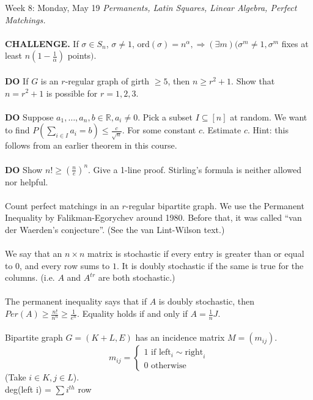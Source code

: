 \documentclass[12pt]{article}
\theoremstyle{remark}
\newcommand{\R}{\mathbb{R}}
\newcommand{\IF}{\text{ if }}
\newcommand{\ow}{\text{ otherwise }}
\newcommand{\ord}{\mathrm{ord}}
\begin{document}
\newpage

\label{22}\begin{section}{Week 8: Monday, May 19}
\indent\textit{Permanents, Latin Squares, Linear Algebra, Perfect Matchings.}
\\\\
\textbf{CHALLENGE.} If $\sigma \in S_n$, $\sigma \neq 1$, $\ord(\sigma) = n^\alpha, \Rightarrow (\exists m)(\sigma^m \neq 1, \sigma^m$ fixes at least $n(1-\frac 1 \alpha)$ points$)$.
\\\\
\textbf{DO} If $G$ is an $r$-regular graph of girth $\geq 5$, then $n \geq r^2 +1$. Show that $n= r^2 + 1$ is possible for $r=1,2,3$.
\\\\
\textbf{DO} Suppose $a_1,\ldots,a_n, b \in \R, a_i \neq 0$. Pick a subset $I \subseteq [n]$ at random. We want to find $P(\sum_{i \in I} a_i = b) \leq \frac{c}{\sqrt{n}}$. For some constant $c$. Estimate $c$. Hint: this follows from an earlier theorem in this course.
\\\\
\textbf{DO} Show $n! \geq (\frac n e) ^n$. Give a 1-line proof. Stirling's formula is neither allowed nor helpful.
\\\\
Count perfect matchings in an $r$-regular bipartite graph. We use the Permanent Inequality by Falikman-Egorychev around 1980. Before that, it was called ``van der Waerden's conjecture''. (See the van Lint-Wilson text.) 
\\\\
We say that an $n \times n$ matrix is stochastic if every entry is greater than or equal to $0$, and every row sums to $1$. It is doubly stochastic if the same is true for the columns. (i.e. $A$ and $A^{tr}$ are both stochastic.) 
\\\\
The permanent inequality says that if $A$ is doubly stochastic, then $Per(A) \geq \frac {n!}{n^n} \geq \frac 1 {e^n}$. Equality holds if and only if $A = \frac 1 n J$.
\\\\
Bipartite graph $G = (K + L,E)$ has an incidence matrix $M = (m_{ij})$.
$$m_{ij} = \begin{cases}1 \IF \mathrm{left}_i \sim \mathrm{right}_i\\
0 \ow \end{cases}$$
(Take $i \in K, j \in L$).
\\
deg(left i) = $\sum i^{th}$ row

\end{section}
\end{document}

